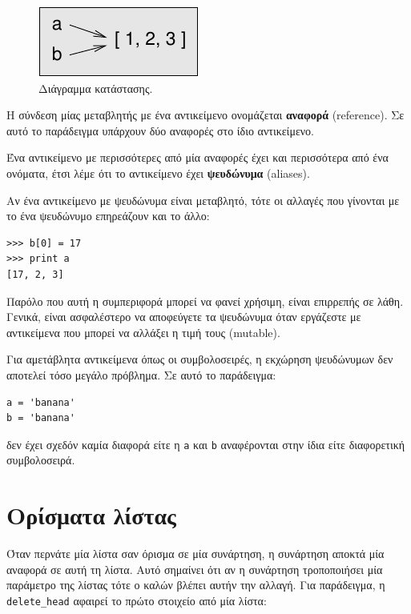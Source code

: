 \documentclass[10pt]{book}
\begin{document}
\begin{figure}
\centerline
{\includegraphics[scale=0.8]{figs/list3.pdf}}
 \caption{Διάγραμμα κατάστασης.} 
\label{fig.list3}
\end{figure}

 
Η σύνδεση μίας μεταβλητής με ένα αντικείμενο ονομάζεται {\bf αναφορά} (reference). Σε αυτό το παράδειγμα υπάρχουν δύο αναφορές στο ίδιο αντικείμενο.

Ένα αντικείμενο με περισσότερες από μία αναφορές έχει και περισσότερα από ένα ονόματα, έτσι λέμε ότι το αντικείμενο έχει {\bf ψευδώνυμα} (aliases).
 
Αν ένα αντικείμενο με ψευδώνυμα είναι μεταβλητό, τότε οι αλλαγές που γίνονται με το ένα ψευδώνυμο επηρεάζουν και το άλλο:

\begin{verbatim}
>>> b[0] = 17
>>> print a
[17, 2, 3]
\end{verbatim}
%
 
Παρόλο που αυτή η συμπεριφορά μπορεί να φανεί χρήσιμη, είναι επιρρεπής σε λάθη. Γενικά, είναι ασφαλέστερο να αποφεύγετε τα ψευδώνυμα όταν εργάζεστε με αντικείμενα που μπορεί να αλλάξει η τιμή τους (mutable).  

Για αμετάβλητα αντικείμενα όπως οι συμβολοσειρές, η εκχώρηση ψευδώνυμων δεν αποτελεί τόσο μεγάλο πρόβλημα. Σε αυτό το παράδειγμα:

\begin{verbatim}
a = 'banana'
b = 'banana'
\end{verbatim}
%

δεν έχει σχεδόν καμία διαφορά είτε η {\tt a} και {\tt b} αναφέρονται στην ίδια είτε διαφορετική συμβολοσειρά.


\section{Ορίσματα λίστας}
\label{list.arguments}

Όταν περνάτε μία λίστα σαν όρισμα σε μία συνάρτηση, η συνάρτηση αποκτά μία αναφορά σε αυτή τη λίστα. Αυτό σημαίνει ότι αν η συνάρτηση τροποποιήσει μία παράμετρο της λίστας τότε ο καλών βλέπει αυτήν την αλλαγή. Για παράδειγμα, η \verb"delete_head" αφαιρεί το πρώτο στοιχείο από μία λίστα:
\end{document}
